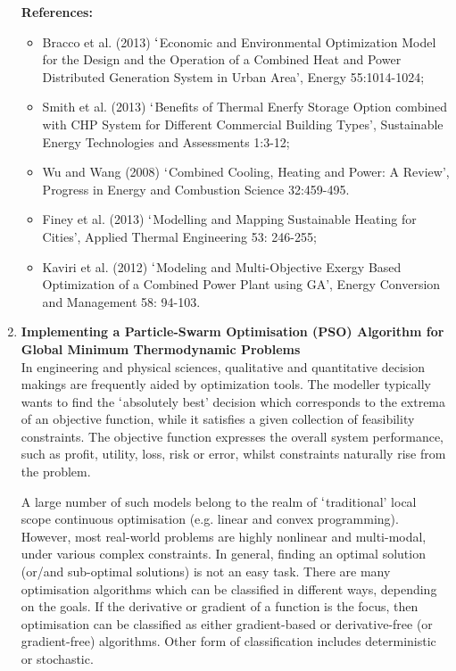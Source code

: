 \documentclass[12pts,a4paper,amsmath,amssymb,floatfix]{article}%
\begin{document}
\begin{enumerate}[label=\bfseries Project \arabic*:]
\noindent
{\bf References:}
\begin{itemize}
\item Bracco et al. (2013) $\lq$Economic and Environmental Optimization Model for the Design and the Operation of a Combined Heat and Power Distributed Generation System in Urban Area’, Energy 55:1014-1024;
\item Smith et al. (2013) $\lq$Benefits of Thermal Enerfy Storage Option combined with CHP System for Different Commercial Building Types’, Sustainable Energy Technologies and Assessments 1:3-12;
\item Wu and Wang (2008) $\lq$Combined Cooling, Heating and Power: A Review’, Progress in Energy and Combustion Science 32:459-495.
\item Finey et al. (2013) $\lq$Modelling and Mapping Sustainable Heating for Cities’, Applied Thermal Engineering 53: 246-255;
\item Kaviri et al. (2012) $\lq$Modeling and Multi-Objective Exergy Based Optimization of a Combined Power Plant using GA’, Energy Conversion and Management 58: 94-103.
\end{itemize}

\clearpage

\item {\bf Implementing a Particle-Swarm Optimisation (PSO) Algorithm for Global Minimum Thermodynamic Problems} \\

In engineering and physical sciences, qualitative and quantitative decision makings are frequently aided by optimization tools. The modeller typically wants to find the $\lq$absolutely best’ decision which corresponds to the extrema of an objective function, while it satisfies a given collection of feasibility constraints. The objective function expresses the overall system performance, such as profit, utility, loss, risk or error, whilst constraints naturally rise from the problem.

A large number of such models belong to the realm of $\lq$traditional' local scope continuous optimisation (e.g. linear and convex programming). However, most real-world problems are highly nonlinear and multi-modal, under various complex constraints. In general, finding an optimal solution (or/and sub-optimal solutions) is not an easy task. There are many optimisation algorithms which can be classified in different ways, depending on the goals. If the derivative or gradient of a function is the focus, then optimisation can be classified as either gradient-based or derivative-free (or gradient-free) algorithms. Other form of classification includes deterministic or stochastic.


\end{enumerate}
\end{document}
